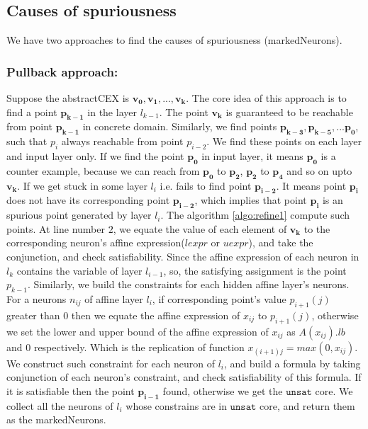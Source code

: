\subsection{Causes of spuriousness} 
We have two approaches to find the causes of spuriousness (markedNeurons). 

\subsubsection{Pullback approach: }

Suppose the abstractCEX is $\boldsymbol{v_0}, \boldsymbol{v_1}, ... , \boldsymbol{v_k}$. 
The core idea of this approach is to find a point $\boldsymbol{p_{k-1}}$ in the layer $l_{k-1}$. 
The point $\boldsymbol{v_k}$ is guaranteed to be reachable from point $\boldsymbol{p_{k-1}}$ in concrete domain.
Similarly, we find points $\boldsymbol{p_{k-3}}, \boldsymbol{p_{k-5}}, ... \boldsymbol{p_0}$, 
such that $p_i$ always reachable from point $p_{i-2}$. 
We find these points on each \relu{} layer and input layer only. 
If we find the point $\boldsymbol{p_0}$ in input layer, it means $\boldsymbol{p_0}$ is a counter example, 
because we can reach from $\boldsymbol{p_0}$ to $\boldsymbol{p_2}$, $\boldsymbol{p_2}$ to $\boldsymbol{p_4}$ 
and so on upto $\boldsymbol{v_k}$. 
If we get stuck in some layer $l_i$ i.e. fails to find point 
$\boldsymbol{p_{i-2}}$. It means point $\boldsymbol{p_i}$ does not have its corresponding point $\boldsymbol{p_{i-2}}$, 
which implies that point $\boldsymbol{p_i}$ is an spurious point generated by \relu{} layer $l_i$. 
The algorithm \ref{algo:refine1} compute such points. At line number $2$, we equate the value of 
each element of $\boldsymbol{v_k}$ to the corresponding neuron's affine expression($lexpr$ or $uexpr$), 
and take the conjunction, and check satisfiability. Since the affine expression of each neuron in $l_k$ contains the 
variable of layer $l_{i-1}$, so, the satisfying assignment is the point $p_{k-1}$. Similarly, we build the constraints
for each hidden affine layer's neurons. For a neurons $n_{ij}$ of affine layer $l_i$, 
if corresponding point's value $p_{i+1}(j)$ greater than $0$ then we equate the affine expression of $x_{ij}$ to $p_{i+1}(j)$,
otherwise we set the lower and upper bound of the affine expression of $x_{ij}$ as $A(x_{ij}).lb$ and $0$ respectively. 
Which is the replication of \relu{} function $x_{(i+1)j} = max(0, x_{ij})$. We construct such constraint 
for each neuron of $l_i$, and build a formula by taking conjunction of each neuron's constraint, 
and check satisfiability of this formula. If it is satisfiable then the point $\boldsymbol{p_{i-1}}$ found, 
otherwise we get the $\mathtt{unsat}$ core. We collect all the neurons of $l_i$ whose constrains are 
in $\mathtt{unsat}$ core, and return them as the markedNeurons.   

